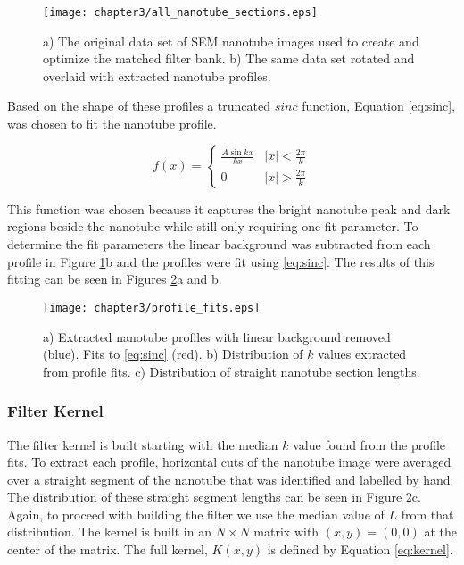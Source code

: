\begin{figure}
	\centering
	\texttt{[image: chapter3/all\_nanotube\_sections.eps]}
	\caption{a) The original data set of SEM nanotube images used to create and optimize the matched filter bank. b) The same data set rotated and overlaid with extracted nanotube profiles.}
	\label{fig:all_nanotube_sections}
\end{figure}

Based on the shape of these profiles a truncated $sinc$ function, Equation \ref{eq:sinc}, was chosen to fit the nanotube profile.

\begin{equation} 
\label{eq:sinc}
    f(x) = \begin{cases} \frac{A\sin{kx}}{kx} & |x| < \frac{2\pi}{k} \\ 
                         0                    & |x| > \frac{2\pi}{k} 
           \end{cases}
\end{equation}

This function was chosen because it captures the bright nanotube peak and dark regions beside the nanotube while still only requiring one fit parameter. To determine the fit parameters the linear background was subtracted from each profile in Figure \ref{fig:all_nanotube_sections}b and the profiles were  fit using \ref{eq:sinc}. The results of this fitting can be seen in Figures \ref{fig:profile_fits}a and b. 

\begin{figure}
	\centering
	\texttt{[image: chapter3/profile\_fits.eps]}
	\caption{a) Extracted nanotube profiles with linear background removed (blue). Fits to \ref{eq:sinc} (red). b) Distribution of $k$ values extracted from profile fits. c) Distribution of straight nanotube section lengths.}
	\label{fig:profile_fits}
\end{figure}

\subsubsection{Filter Kernel}

The filter kernel is built starting with the median $k$ value found from the profile fits. To extract each profile, horizontal cuts of the nanotube image were averaged over a straight segment of the nanotube that was identified and labelled by hand. The distribution of these straight segment lengths can be seen in Figure \ref{fig:profile_fits}c. Again, to proceed with building the filter we use the median value of $L$ from that distribution. The kernel is built in an $N \times N$ matrix with $(x,y) = (0,0)$ at the center of the matrix. The full kernel, $K(x,y)$ is defined by Equation \ref{eq:kernel}.

